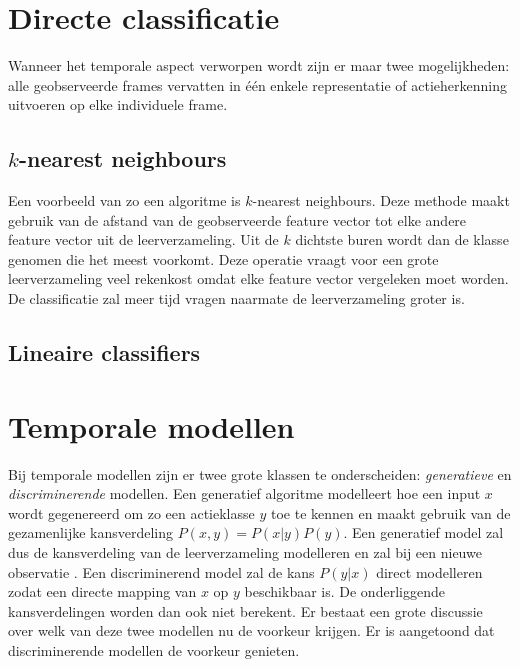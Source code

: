 \section{Directe classificatie}
Wanneer het temporale aspect verworpen wordt zijn er maar twee mogelijkheden: alle geobserveerde frames vervatten in één enkele representatie of actieherkenning uitvoeren op elke individuele frame. 

\subsection{$k$-nearest neighbours}

Een voorbeeld van zo een algoritme is $k$-nearest neighbours. Deze methode maakt gebruik van de afstand van de geobserveerde feature vector tot elke andere feature vector uit de leerverzameling. Uit de $k$ dichtste buren wordt dan de klasse genomen die het meest voorkomt. Deze operatie vraagt voor een grote leerverzameling veel rekenkost omdat elke feature vector vergeleken moet worden. De classificatie zal meer tijd vragen naarmate de leerverzameling groter is. 

\subsection{Lineaire classifiers}


\section{Temporale modellen}
\label{subsec:temporale_modellen}
Bij temporale modellen zijn er twee grote klassen te onderscheiden: \textit{generatieve} en \textit{discriminerende} modellen. Een generatief algoritme modelleert hoe een input $x$ wordt gegenereerd om zo een actieklasse $y$ toe te kennen en maakt gebruik van de gezamenlijke kansverdeling $P(x, y) = P(x|y)P(y)$. Een generatief model zal dus de kansverdeling van de leerverzameling modelleren en zal bij een nieuwe observatie . Een discriminerend model zal de kans $P(y|x)$ direct modelleren zodat een directe mapping van $x$ op $y$ beschikbaar is. De onderliggende kansverdelingen worden dan ook niet berekent.
 Er bestaat een grote discussie over welk van deze twee modellen nu de voorkeur krijgen. Er is aangetoond \cite{Andrew2002} dat discriminerende modellen de voorkeur genieten.

